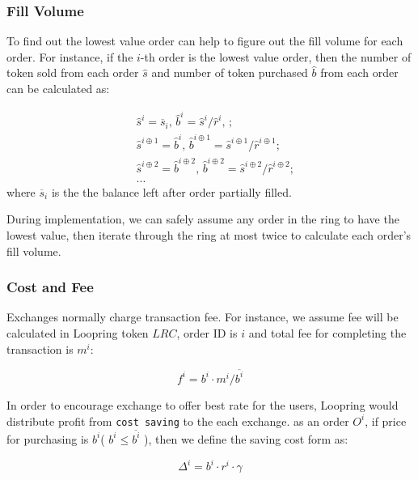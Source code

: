 \documentclass[UTF8,nofonts]{article}
\begin{document}
\subsubsection{Fill Volume\label{sec: matchquantity}}

To find out the lowest value order can help to figure out the fill volume for each order. For instance, if the $i$-th order is the lowest value order, then the number of token sold from each order $\hat{s}$ and number of token purchased $\hat{b}$ from each order can be calculated as:

\[
\begin{split}
&\hat{s}^{i}=\overline{s}_i\text{, } \hat{b}^{i}=\hat{s}^{i}/ \hat{r}^i\text{, }\text{;}\\
&\hat{s}^{i\oplus 1}=\hat{b}^i\text{, } \hat{b}^{i\oplus 1}=\hat{s}^{i\oplus 1}/ \hat{r}^{i\oplus 1}\text{;}\\
&\hat{s}^{i\oplus 2}=\hat{b}^{i\oplus 2}\text{, } \hat{b}^{i\oplus 2}=\hat{s}^{i\oplus 2}/ \hat{r}^{i\oplus 2}\text{;}\\
& ...
\end{split}
\]
where $\overline{s}_i$ is the the balance left after order partially filled.

During implementation, we can safely assume any order in the ring to have the lowest value, then iterate through the ring at most twice to calculate each order's fill volume. 

\subsubsection{Cost and Fee\label{sec: fee}}

Exchanges normally charge transaction fee. For instance,  we assume fee will be calculated in Loopring token $LRC$, order ID is $i$ and total fee for completing the transaction is $m^i$: 

\begin{equation*}
f^i = b^i \cdot m^i / \overline{b^i}
\end{equation*}


In order to encourage exchange to offer best rate for the users,  Loopring would distribute profit from \texttt{cost saving} to the each exchange. as an order $O^i$,  if price for purchasing is $b^i$( $b^i \le \overline{b^i}$ ),  then we define the saving cost form as: 

\begin{equation*}
\Delta^i = b^i \cdot r^i \cdot \gamma
\end{equation*}
\end{document}

